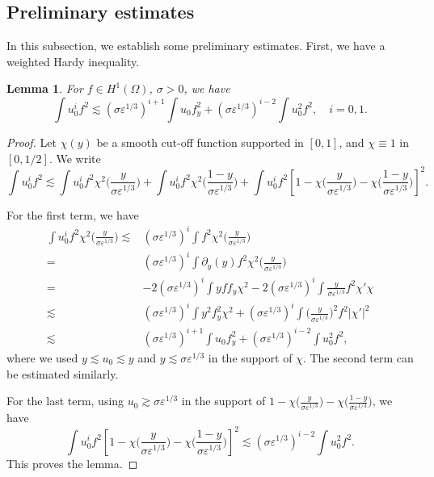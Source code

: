 \documentclass[reqno, 11pt]{amsart}
\theoremstyle{plain}
\newtheorem{lemma}[theorem]{Lemma}
\theoremstyle{definition}
\theoremstyle{remark}
\numberwithin{equation}{section}
\begin{document}
\subsection{Preliminary estimates}\label{sec:L_prelim}
In this subsection, we establish some preliminary estimates. First, we have a weighted Hardy inequality.
\begin{lemma}\label{lem_hardy1}
For $f \in H^1(\Omega)$, $\sigma > 0$, we have
\begin{equation}\label{Hardy1}
\int u_0^i f^2 \lesssim (\sigma \varepsilon^{1/3})^{i+1}  \int u_0 f_{y}^2 + (\sigma \varepsilon^{1/3})^{i-2}  \int u_0^2 f^2, \quad i=0,1.
\end{equation}
\end{lemma}
\begin{proof}
Let $\chi(y)$ be a smooth cut-off function supported in $[0,1]$, and $\chi \equiv 1$ in $[0, 1/2]$. We write
$$
\int u_0^i  f^2 \lesssim \int u_0^i f^2 \chi^2 \Big( \frac{y}{\sigma \varepsilon^{1/3}} \Big) + \int u_0^i f^2 \chi^2 \Big( \frac{1-y}{\sigma \varepsilon^{1/3}} \Big)+ \int u_0^i f^2 [1-\chi\Big( \frac{y}{\sigma \varepsilon^{1/3}} \Big) - \chi \Big( \frac{1-y}{\sigma \varepsilon^{1/3}}  \Big)]^2.
$$

For the first term, we have
\begin{align*}
\int u_0^i f^2 \chi^2 \Big( \frac{y}{\sigma \varepsilon^{1/3}} \Big) \lesssim & (\sigma \varepsilon^{1/3})^i \int  f^2 \chi^2 \Big( \frac{y}{\sigma \varepsilon^{1/3}} \Big)\\
 =& (\sigma \varepsilon^{1/3})^i  \int \partial_y(y) f^2 \chi^2 \Big( \frac{y}{\sigma \varepsilon^{1/3}} \Big)\\
=&-2 (\sigma \varepsilon^{1/3})^i  \int y f f_y \chi^2 - 2 (\sigma \varepsilon^{1/3})^i  \int \frac{y}{\sigma \varepsilon^{1/3}} f^2 \chi' \chi\\
\lesssim & (\sigma \varepsilon^{1/3})^i  \int y^2 f_{y}^2 \chi^2 + (\sigma \varepsilon^{1/3})^i  \int \Big( \frac{y}{\sigma \varepsilon^{1/3}} \Big)^2 f^2 |\chi'|^2\\
\lesssim & (\sigma \varepsilon^{1/3})^{i+1}  \int u_0 f_y^2 + (\sigma \varepsilon^{1/3})^{i-2} \int u_0^2 f^2,
\end{align*}
where we used $y \lesssim u_0 \lesssim y$ and $y \lesssim \sigma \varepsilon^{1/3}$ in the support of $\chi$. The second term can be estimated similarly.

For the last term, using $u_0 \gtrsim \sigma \varepsilon^{1/3}$ in the support of $1-\chi\Big( \frac{y}{\sigma \varepsilon^{1/3}} \Big) - \chi \Big( \frac{1-y}{\sigma \varepsilon^{1/3}}  \Big)$, we have
$$
\int u_0^i f^2 [1-\chi\Big( \frac{y}{\sigma \varepsilon^{1/3}} \Big) - \chi \Big( \frac{1-y}{\sigma \varepsilon^{1/3}}  \Big)]^2 \lesssim (\sigma \varepsilon^{1/3})^{i-2} \int u_0^2 f^2.
$$
This proves the lemma.
\end{proof}
\end{document}

